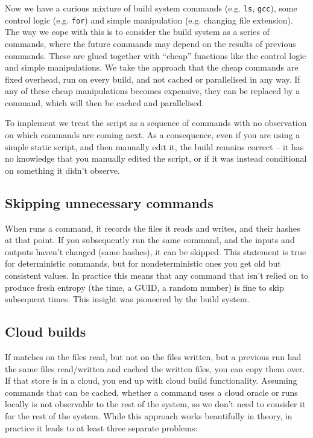 Now we have a curious mixture of build system commands (e.g. \texttt{ls}, \texttt{gcc}), some control logic (e.g. \texttt{for}) and simple manipulation (e.g. changing file extension). The way we cope with this is to consider the build system as a series of commands, where the future commands may depend on the results of previous commands. These are glued together with ``cheap'' functions like the control logic and simple manipulations. We take the approach that the cheap commands are fixed overhead, run on every build, and not cached or parallelised in any way. If any of these cheap manipulations becomes expensive, they can be replaced by a command, which will then be cached and parallelised.

To implement \Rattle we treat the script as a sequence of commands with no observation on which commands are coming next. As a consequence, even if you are using a simple static script, and then manually edit it, the \Rattle build remains correct -- it has no knowledge that you manually edited the script, or if it was instead conditional on something it didn't observe.

\subsection{Skipping unnecessary commands}

When \Rattle runs a command, it records the files it reads and writes, and their hashes at that point. If you subsequently run the same command, and the inputs and outputs haven't changed (same hashes), it can be skipped. This statement is true for deterministic commands, but for nondeterministic ones you get old but consistent values. In practice this means that any command that isn't relied on to produce fresh entropy (the time, a GUID, a random number) is fine to skip subsequent times. This insight was pioneered by the \Fabricate\citep{fabricate} build system.

\subsection{Cloud builds}

If \Rattle matches on the files read, but not on the files written, but a previous run had the same files read/written and cached the written files, you can copy them over. If that store is in a cloud, you end up with cloud build functionality. Assuming commands that can be cached, whether a command uses a cloud oracle or runs locally is not observable to the rest of the system, so we don't need to consider it for the rest of the system. While this approach works beautifully in theory, in practice it leads to at least three separate problems:

